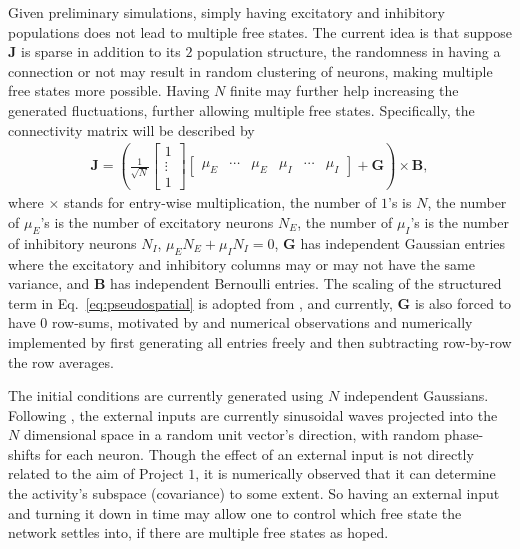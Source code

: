 \documentclass[11pt,openany,oneside]{article} %
\newcommand{\ooo}[1]{\left( {#1}\right)}\newcommand{\mooo}[1]{\big( {#1}\big)}\newcommand{\looo}[1]{\left( {#1}\right.}\newcommand{\rooo}[1]{\left. {#1}\right)}%
\newcommand{\bmx}[1]{\begin{bmatrix}#1\end{bmatrix}}%
\newcommand{\bd}[1]{\boldsymbol{#1}}%
\begin{document}
Given preliminary simulations, simply having excitatory and inhibitory populations does not lead to
multiple free states.  The current idea is that suppose $\bd{J}$ is sparse in addition to its $2$
population structure, the randomness in having a connection or not may result in random clustering
of neurons, making multiple free states more possible.
Having $N$ finite may further help
increasing the generated fluctuations, further allowing multiple free states.  Specifically,
the connectivity matrix will be described by
\begin{align}
  \label{eq:pseudospatial}
  \bd{J} = \ooo{\frac{1}{\sqrt{N}}\bmx{1\\\vdots\\1}\bmx{\mu_E&\cdots&\mu_E&\mu_I&\cdots&\mu_I}+\bd{G}}\times\bd{B},
\end{align}
where $\times$ stands for entry-wise multiplication, the number of $1$'s is $N$, the number of $\mu_E$'s is the number of excitatory neurons $N_E$,
the number of $\mu_I$'s is the number of inhibitory neurons $N_I$, $\mu_EN_E+\mu_IN_I = 0$, $\bd{G}$
has independent Gaussian entries where the excitatory and inhibitory columns may or may not have the
same variance, and $\bd{B}$ has independent Bernoulli entries.  The scaling of the structured term
in Eq.~\ref{eq:pseudospatial} is adopted from \citet{landau2021Macroscopic}, and currently, $\bd{G}$ is also forced to
have $0$ row-sums, motivated by \citet{rajan2006Eigenvalue} and numerical observations and numerically implemented by
first generating all entries freely and then subtracting row-by-row the row averages.

The initial conditions are currently generated using $N$ independent Gaussians.  Following
\citet{rajan2010Stimulusdependent}, the external inputs are currently sinusoidal waves projected
into the $N$ dimensional space in a random unit vector's direction, with random phase-shifts for
each neuron.  Though the effect of an external input is not directly related to the aim of Project
$1$, it is numerically observed that it can determine the activity's subspace (covariance) to some
extent.  So having an external input and turning it down in time may allow one to control which free
state the network settles into, if there are multiple free states as hoped.
\end{document}
